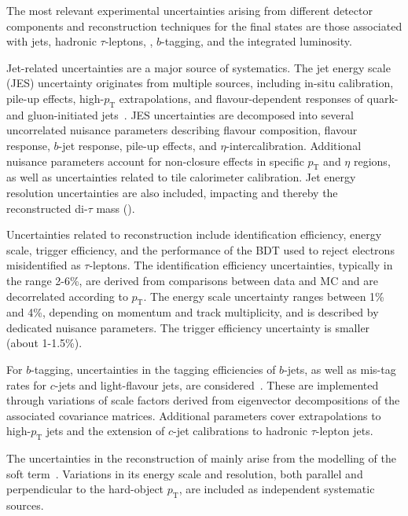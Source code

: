 The most relevant experimental uncertainties arising from different detector components and reconstruction techniques for the \ttHtt final states are those associated with jets, hadronic $\tau$-leptons, \etmiss, $b$-tagging, and the integrated luminosity.  

Jet-related uncertainties are a major source of systematics. The jet energy scale (JES) uncertainty originates from multiple sources, including in-situ calibration, pile-up effects, high-$p_{\text{T}}$ extrapolations, and flavour-dependent responses of quark- and gluon-initiated jets~\cite{ATLAS_JES}. JES uncertainties are decomposed into several uncorrelated nuisance parameters describing flavour composition, flavour response, $b$-jet response, pile-up effects, and $\eta$-intercalibration. Additional nuisance parameters account for non-closure effects in specific $p_{\text{T}}$ and $\eta$ regions, as well as uncertainties related to tile calorimeter calibration. Jet energy resolution uncertainties are also included, impacting \etmiss and thereby the reconstructed di-$\tau$ mass (\mtt).  

Uncertainties related to \tauhad reconstruction include identification efficiency, energy scale, trigger efficiency, and the performance of the BDT used to reject electrons misidentified as $\tau$-leptons. The identification efficiency uncertainties, typically in the range 2-6\%, are derived from comparisons between data and MC and are decorrelated according to $p_{\text{T}}$. The energy scale uncertainty ranges between 1\% and 4\%, depending on momentum and track multiplicity, and is described by dedicated nuisance parameters. The trigger efficiency uncertainty is smaller (about 1-1.5\%).  

For $b$-tagging, uncertainties in the tagging efficiencies of $b$-jets, as well as mis-tag rates for $c$-jets and light-flavour jets, are considered~\cite{ATLAS_bjet_syst}. These are implemented through variations of scale factors derived from eigenvector decompositions of the associated covariance matrices. Additional parameters cover extrapolations to high-$p_{\text{T}}$ jets and the extension of $c$-jet calibrations to hadronic $\tau$-lepton jets.  

The uncertainties in the reconstruction of \etmiss mainly arise from the modelling of the soft term~\cite{ATLAS-CONF-2018-023}. Variations in its energy scale and resolution, both parallel and perpendicular to the hard-object $p_{\text{T}}$, are included as independent systematic sources.  

